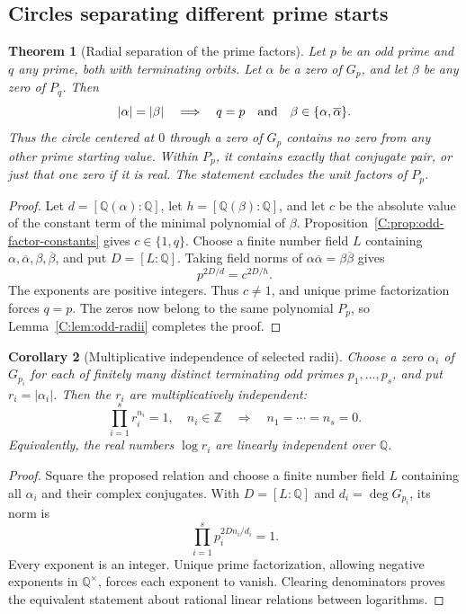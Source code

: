 \documentclass[11pt,a4paper]{article}
\newtheorem{theorem}{Theorem}[section]
\newtheorem{corollary}[theorem]{Corollary}
\theoremstyle{definition}
\theoremstyle{remark}
\numberwithin{equation}{section}
\begin{document}
\subsection{Circles separating different prime starts}

\begin{theorem}[Radial separation of the prime factors]
\label{C:thm:prime-radial-separation}
Let $p$ be an odd prime and $q$ any prime, both with terminating orbits. Let $\alpha$
be a zero of $G_p$, and let $\beta$ be any zero of $P_q$. Then
\[
 |\alpha|=|\beta|
 \quad\Longrightarrow\quad
 q=p\quad\hbox{and}\quad
 \beta\in\{\alpha,\overline\alpha\}.
\]
Thus the circle centered at $0$ through a zero of $G_p$ contains no
zero from any other prime starting value. Within $P_p$, it contains
exactly that conjugate pair, or just that one zero if it is real.
The statement excludes the unit factors of $P_p$.
\end{theorem}

\begin{proof}
Let $d=[\mathbb Q(\alpha):\mathbb Q]$, let
$h=[\mathbb Q(\beta):\mathbb Q]$, and let $c$ be the absolute value
of the constant term of the minimal polynomial of $\beta$.
Proposition~\ref{C:prop:odd-factor-constants} gives $c\in\{1,q\}$.
Choose a finite number field $L$ containing
$\alpha,\overline\alpha,\beta,\overline\beta$, and put
$D=[L:\mathbb Q]$. Taking field norms of
$\alpha\overline\alpha=\beta\overline\beta$ gives
\[
 p^{2D/d}=c^{2D/h}.
\]
The exponents are positive integers. Thus $c\ne1$, and unique prime
factorization forces $q=p$. The zeros now belong to the same
polynomial $P_p$, so Lemma~\ref{C:lem:odd-radii} completes the proof.
\end{proof}

\begin{corollary}[Multiplicative independence of selected radii]
\label{C:cor:prime-radii-independent}
Choose a zero $\alpha_i$ of $G_{p_i}$ for each of finitely many distinct
terminating odd primes $p_1,\ldots,p_s$, and put $r_i=|\alpha_i|$.
Then the $r_i$ are multiplicatively independent:
\[
 \prod_{i=1}^s r_i^{n_i}=1,\quad n_i\in\mathbb Z
 \quad\Longrightarrow\quad n_1=\cdots=n_s=0.
\]
Equivalently, the real numbers $\log r_i$ are linearly independent
over $\mathbb Q$.
\end{corollary}

\begin{proof}
Square the proposed relation and choose a finite number field $L$
containing all $\alpha_i$ and their complex conjugates. With
$D=[L:\mathbb Q]$ and $d_i=\deg G_{p_i}$, its norm is
\[
 \prod_{i=1}^s p_i^{2Dn_i/d_i}=1.
\]
Every exponent is an integer. Unique prime factorization, allowing
negative exponents in $\mathbb Q^\times$, forces each exponent to
vanish. Clearing denominators proves the equivalent statement about
rational linear relations between logarithms.
\end{proof}
\end{document}
